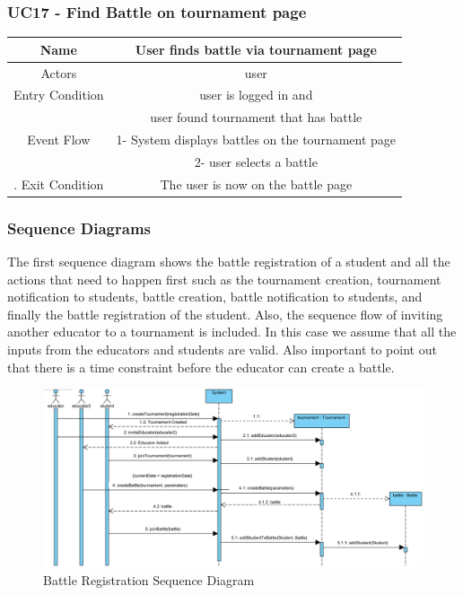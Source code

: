 \documentclass{article}
\begin{document}
\subsubsection*{UC17 - Find Battle on tournament page}

\begin{tabular*}{\linewidth}{@{\extracolsep{\fill}} cc }
    \hline
    Name & User finds battle via tournament page\\ 
    \hline
    Actors & user\\ 
    \hline
    Entry Condition & user is logged in and\\
                    & user found tournament that has battle\\
    \hline
    Event Flow & 1- System displays battles on the tournament page\\
               & 2- user selects a battle\\
    \hline.
    Exit Condition & The user is now on the battle page\\
                
    \hline
\end{tabular*}

\subsubsection{Sequence Diagrams}

The first sequence diagram shows the battle registration of a student and all the actions that need to happen first
such as the tournament creation, tournament notification to students, battle creation, battle notification to students,
and finally the battle registration of the student. Also, the sequence flow of inviting another educator to a tournament
is included. In this case we assume that all the inputs from the educators and students are valid. Also important to point out
that there is a time constraint before the educator can create a battle.
\begin{center}
\begin{figure}[!h]
    \centering
    \includegraphics[width=1\textwidth]{images/BattleRegistrationSequenceDiagram}
    \caption{Battle Registration Sequence Diagram}
    \label{fig:BattleRegistrationSequenceDiagram}
\end{figure}
\end{center}
\end{document}
